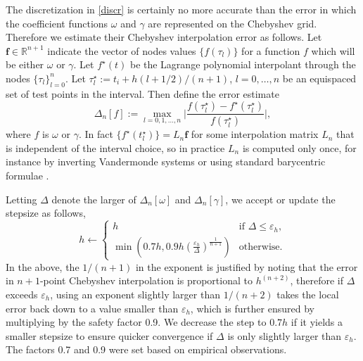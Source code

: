 \documentclass[10pt]{article}
\newcommand{\be}{\begin{equation}}
\newcommand{\ee}{\end{equation}}
\newcommand{\mbf}[1]{{\mathbf #1}}
\newcommand{\R}{\mathbb{R}}
\newcommand{\om}{\omega}
\newcommand{\g}{\gamma}
\begin{document}
The discretization in \cref{discr} is certainly no more accurate than
the error in which the coefficient functions $\om$ and $\g$ are represented
on the Chebyshev grid.
Therefore we estimate their Chebyshev interpolation error as follows.
Let $\mbf{f}\in\R^{n+1}$ indicate the vector of nodes values
$\{f(\tau_l)\}$ for a function $f$ which will be either $\om$ or $\g$.
Let $f^\star(t)$ be the Lagrange polynomial interpolant through the
nodes $\{\tau_l\}_{l=0}^n$.
Let $\tau^\star_l := t_i + h(l+1/2)/(n+1)$, $l=0,\dots,n$ be an equispaced set of
test points in the interval.
Then define the error estimate
\be
    \Delta_n[f] := \max_{l = 0, 1, \ldots, n} \biggl| \frac{f(\tau^{\star}_l) -
    f^{\star}(\tau^{\star}_l)}{f(\tau^{\star}_l)} \biggr|,
\ee
where $f$ is $\om$ or $\g$.
In fact $\{f^{\star}(t^{\star}_l)\} = L_n \mbf{f}$ for some interpolation matrix
$L_n$ that is independent of the interval choice, so in practice
$L_n$ is computed only once, for instance by inverting Vandermonde systems
or using standard barycentric formulae \cite{tref}.

Letting $\Delta$ denote the larger of $\Delta_n[\om]$ and $\Delta_n[\g]$, we accept or update the stepsize as follows,
\be
    h \leftarrow \begin{cases}
        h &\text{if } \Delta \leq \varepsilon_h, \\
        \min \left( 0.7h, 0.9 h \left( \frac{\varepsilon_h}{\Delta} \right)^{\frac{1}{n+1}} \right) &\text{otherwise}.
    \end{cases}
    \ee
In the above, the $1/(n+1)$ in the exponent is justified by noting that the
error in $n+1$-point Chebyshev interpolation is proportional to $h^(n+2)$, therefore if
$\Delta$ exceeds $\varepsilon_h$, using an exponent slightly larger than $1/(n+2)$ takes
the local error back down to a value smaller than $\varepsilon_h$, which is further
ensured by multiplying by the safety factor 0.9. We decrease the step to $0.7h$
if it yields a smaller stepsize to ensure quicker convergence if $\Delta$ is
only slightly larger than $\varepsilon_h$. The factors 0.7 and 0.9 were set based on
empirical observations. 
\end{document}
